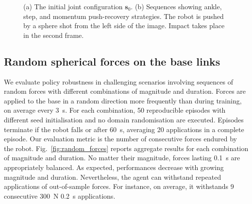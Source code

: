 \begin{figure}
    \centering
    \hspace{-3mm}
    \caption{(a) The initial joint configuration $\boldsymbol{s}_0$. (b) Sequences showing ankle, step, and momentum push-recovery strategies. The robot is pushed by a sphere shot from the left side of the image. Impact takes place in the second frame.}
    \label{fig:q0_and_sequences}
\end{figure}

\subsection{Random spherical forces on the base links}

We evaluate policy robustness in challenging scenarios involving sequences of random forces with different combinations of magnitude and duration.
Forces are applied to the base in a random direction more frequently than during training, on average every 3~s.
For each combination, 50 reproducible episodes with different seed initialisation and no domain randomisation are executed.
Episodes terminate if the robot falls or after 60~s, averaging 20 applications in a complete episode.
Our evaluation metric is the number of consecutive forces endured by the robot.
Fig.~\ref{fig:random_forces} reports aggregate results for each combination of magnitude and duration.
No matter their magnitude, forces lasting 0.1~s are appropriately balanced.
As expected, performances decrease with growing magnitude and duration.
Nevertheless, the agent can withstand repeated applications of out-of-sample forces.
For instance, on average, it withstands 9 consecutive 300~N 0.2~s applications.

